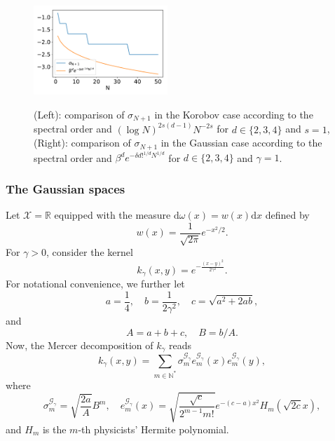 \documentclass[twoside,11pt]{book}
\numberwithin{theorem}{chapter}
\numberwithin{definition}{chapter}
\numberwithin{proposition}{chapter}
\numberwithin{corollary}{chapter}
\numberwithin{example}{chapter}
\numberwithin{lemma}{chapter}
\numberwithin{assumption}{chapter}
\numberwithin{equation}{chapter}
\numberwithin{figure}{chapter}
\begin{document}
\begin{figure}[]
\includegraphics[width= 0.45\textwidth]{img/neurips/multiHermite/comparison/Gaussian_4D_scale_1_eig_comparison.pdf}
\\
\caption{(Left): comparison of $\sigma_{N+1}$ in the Korobov case according to the spectral order and $(\log N)^{2s(d-1)}N^{-2s}$ for $d \in \{2,3,4\}$ and $s=1$, (Right): comparison of $\sigma_{N+1}$ in the Gaussian case according to the spectral order and $\beta^{d}e^{-\delta d!^{1/d}N^{1/d}}$ for $d \in \{2,3,4\}$ and $\gamma = 1$.}
\label{f:rates}
\end{figure}



\subsubsection{The Gaussian spaces}
Let $\mathcal{X} = \mathbb{R}$ equipped with the measure $\mathrm{d} \omega(x) = w(x) \mathrm{d}x$ defined by
\begin{equation}
w(x) = \frac{1}{\sqrt{2 \pi} }e^{-x^{2}/2}.
\end{equation}
For $\gamma >0$, consider the kernel
\begin{equation}
k_{\gamma}(x,y) = e^{-\frac{(x-y)^{2}}{2\gamma^{2}}}.
\end{equation}
For notational convenience, we further let
\begin{equation}
a = \frac{1}{4}, \quad b = \frac{1}{2 \gamma^{2}}, \quad c = \sqrt{a^{2} + 2ab},
\end{equation}
and
\begin{equation}
A = a + b + c,  \quad B = b/A.
\end{equation}
Now, the Mercer decomposition of $k_{\gamma}$ reads \cite{Ras03}
\begin{equation}
k_{\gamma}(x,y) = \sum\limits_{m \in \mathbb{N}^{*}} \sigma_{m}^{\mathcal{G}_{\gamma}}e_{m}^{\mathcal{G}_{\gamma}}(x)e_{m}^{\mathcal{G}_{\gamma}}(y),
\end{equation}
where
\begin{equation}
\sigma_{m}^{\mathcal{G}_{\gamma}} = \sqrt{\frac{2a}{A}} B^{m}, \quad e_{m}^{\mathcal{G}_{\gamma}}(x) = \sqrt{\frac{\sqrt{c}}{2^{m-1}m!}}e^{-(c-a)x^{2}}H_{m}(\sqrt{2c}x),
\end{equation}
and $H_{m}$ is the $m$-th physicists' Hermite polynomial. 
\end{document}
